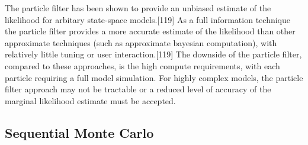 \documentclass[11pt,twoside]{bristolthesis}
\begin{document}
  The particle filter has been shown to provide an unbiased estimate of the likelihood for arbitary state-space models.{[}119{]} As a full information technique the particle filter provides a more accurate estimate of the likelihood than other approximate techniques (such as approximate bayesian computation), with relatively little tuning or user interaction.{[}119{]} The downside of the particle filter, compared to these approaches, is the high compute requirements, with each particle requiring a full model simulation. For highly complex models, the particle filter approach may not be tractable or a reduced level of accuracy of the marginal likelihood estimate must be accepted.
  
  \hypertarget{sequential-monte-carlo}{%
  \subsection{Sequential Monte Carlo}\label{sequential-monte-carlo}}
  
\end{document}
